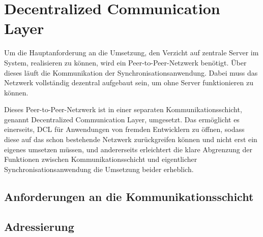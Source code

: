 \chapter{Decentralized Communication Layer}
\renewcommand{\kapitelautor}{Autor: Martin Exner}

Um die Hauptanforderung an die Umsetzung, den Verzicht auf zentrale Server im System, realisieren zu können,
wird ein Peer-to-Peer-Netzwerk benötigt. Über dieses läuft die Kommunikation der Synchronisationsanwendung.
Dabei muss das Netzwerk vollständig dezentral aufgebaut sein, um ohne Server funktionieren zu können.

Dieses Peer-to-Peer-Netzwerk ist in einer separaten Kommunikationsschicht, genannt Decentralized Communication Layer, umgesetzt.
Das ermöglicht es einerseits, DCL für Anwendungen von fremden Entwicklern zu öffnen, sodass diese auf das schon bestehende Netzwerk
zurückgreifen können und nicht erst ein eigenes umsetzen müssen, und andererseits erleichtert die klare Abgrenzung der Funktionen
zwischen Kommunikationsschicht und eigentlicher Synchronisationsanwendung die Umsetzung beider erheblich.

\section{Anforderungen an die Kommunikationsschicht}


\section{Adressierung}

